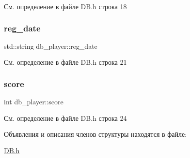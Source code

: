 См. определение в файле D\+B.\+h строка 18

\mbox{\label{structdb__player_abef0de717f781b401effd7d3c35550c2}} 
\subsubsection{\texorpdfstring{reg\_date}{reg\_date}}
{\footnotesize\ttfamily std\+::string db\+\_\+player\+::reg\+\_\+date}



См. определение в файле D\+B.\+h строка 21

\mbox{\label{structdb__player_a49a7074936df50c10ce3573663e902bc}} 
\subsubsection{\texorpdfstring{score}{score}}
{\footnotesize\ttfamily int db\+\_\+player\+::score}



См. определение в файле D\+B.\+h строка 24



Объявления и описания членов структуры находятся в файле\+:\begin{DoxyCompactItemize}
\item 
\mbox{\hyperlink{_d_b_8h}{D\+B.\+h}}\end{DoxyCompactItemize}
